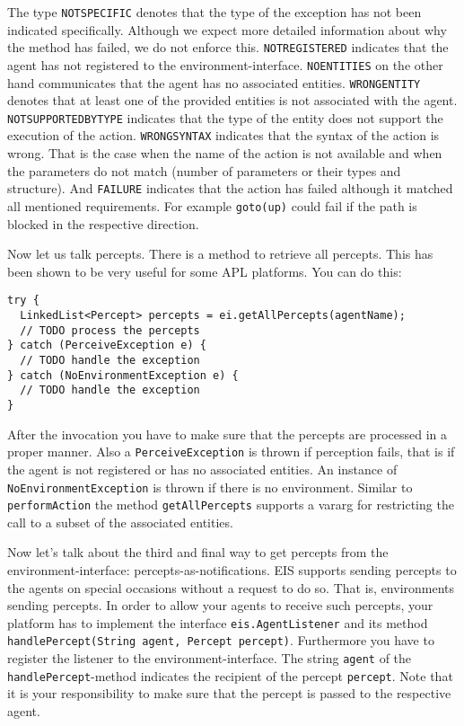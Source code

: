 \documentclass[a4]{article}
\newcommand{\EIS}{\textsf{EIS}\xspace}
\begin{document}
The type \texttt{NOTSPECIFIC} denotes that the type of the exception has not been indicated specifically. 
Although we expect  more detailed information about why the method has failed, we do not enforce this.
\texttt{NOTREGISTERED} indicates that the agent has not registered to the environment-interface.
\texttt{NOENTITIES} on the other hand communicates that the agent has no associated entities.
\texttt{WRONGENTITY} denotes that at least one of the provided entities is not associated with the agent.
\texttt{NOTSUPPORTEDBYTYPE} indicates that the type of the entity does not support the execution of the action.
\texttt{WRONGSYNTAX} indicates that the syntax of the action is wrong. 
That is the case when the name of the action is not available and when the parameters do not match (number of parameters or their types and structure).
And \texttt{FAILURE} indicates that the action has failed although it matched all mentioned requirements. 
For example \texttt{goto(up)} could fail if the path is blocked in the respective direction.
 
Now let us talk percepts. There is a method to retrieve all percepts. This has been shown to be very useful for some APL platforms.
You can do this:
\begin{verbatim}
try {
  LinkedList<Percept> percepts = ei.getAllPercepts(agentName);
  // TODO process the percepts
} catch (PerceiveException e) {
  // TODO handle the exception
} catch (NoEnvironmentException e) {
  // TODO handle the exception
}
\end{verbatim}
After the invocation you have to make sure that the percepts are processed in a proper manner. 
Also a \texttt{PerceiveException} is thrown if perception fails, that is if the agent is not registered or has no associated
entities. An instance of \texttt{NoEnvironmentException} is thrown if there is no environment. Similar
to \texttt{performAction} the method \texttt{getAllPercepts} supports a vararg for restricting the call to a subset of the
associated entities.

Now let's talk about the third and final way to get percepts from the environment-interface: percepts-as-notifications.
\EIS supports sending percepts to the agents on special occasions without a request to do so. That is, environments
sending percepts. 
In order to allow your agents to receive such percepts, your platform has to implement the interface \texttt{eis.AgentListener} and its method \texttt{handlePercept(String agent, Percept percept)}. 
Furthermore you have to register the listener to the environment-interface.
The string \texttt{agent} of the \texttt{handlePercept}-method indicates the recipient of the percept \texttt{percept}.
Note that it is your responsibility to make sure that the percept is passed to the respective agent.
\end{document}
